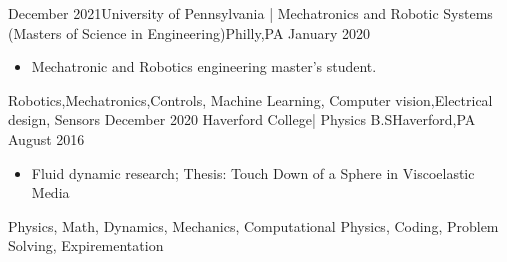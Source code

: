 %
%
%


\begin{experiences}
 \experience
    {December 2021}{University of Pennsylvania | Mechatronics and Robotic Systems }{(Masters of Science in Engineering)}{Philly,PA}
    {January 2020} {
                      \begin{itemize}
                        \item Mechatronic and Robotics engineering master's student.
                      \end{itemize}
                    }
                     {Robotics,Mechatronics,Controls, Machine Learning, Computer vision,Electrical design, Sensors}
  \emptySeparator
  \experience
    {December 2020}   {Haverford College| Physics }{B.S}{Haverford,PA}
    {August 2016} {
                      \begin{itemize}
    			    \item Fluid dynamic research; Thesis: Touch Down of a Sphere in Viscoelastic Media     	
                                                 
                      \end{itemize}
                    }
                     {Physics, Math, Dynamics, Mechanics, Computational Physics, Coding, Problem Solving, Expirementation}

\end{experiences}


